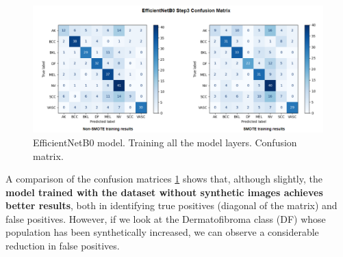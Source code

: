 \begin{figure}[ht]
    \begin{center}
        \includegraphics[scale=0.58]{images/Building/Model Efficientnet/model_ENetB0_3 Confmat.png}
        \caption{EfficientNetB0 model. Training all the model layers. Confusion matrix.}
    \label{fig: Model_ENet_3_confmat}    
    \end{center}
\end{figure}


A comparison of the confusion matrices \ref{fig: Model_ENet_3_confmat} shows that, although slightly, the \textbf{model trained with the dataset without synthetic images achieves better results}, both in identifying true positives (diagonal of the matrix) and false positives. However, if we look at the Dermatofibroma class (DF)   whose population has been synthetically increased, we can observe a considerable reduction in false positives.  

\begin{table}[ht]
\centering
{}
    \caption{EffcientNet B0 Step 3. Metrics obtained by class.}
    \label{tbl: Model_ENet_3_class_values}
\end{table}

